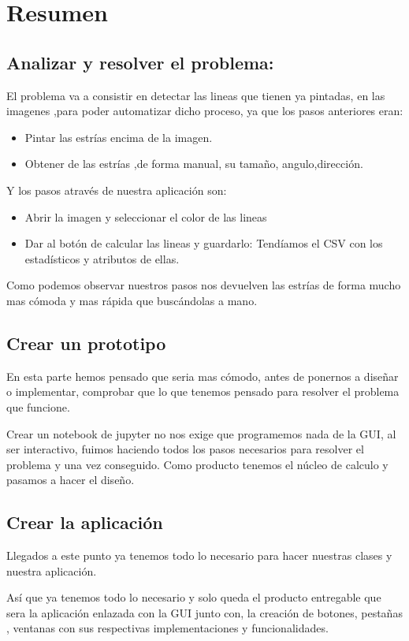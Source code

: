 \section{Resumen}

\subsection{Analizar y resolver el problema:}
El problema va a consistir en detectar las lineas que tienen ya pintadas, en las imagenes ,para poder automatizar dicho proceso, ya que los pasos anteriores eran:
\begin{itemize}
\item Pintar las estrías encima de la imagen.
\item Obtener de las estrías ,de forma manual, su tamaño, angulo,dirección.
\end{itemize}
Y los pasos através de nuestra aplicación son:
\begin{itemize}
\item Abrir la imagen y seleccionar el color de las lineas
\item Dar al botón de calcular las lineas y guardarlo: Tendíamos el CSV con los estadísticos y atributos de ellas.
\end{itemize}
Como podemos observar nuestros pasos nos devuelven las estrías de forma mucho mas cómoda y mas rápida que buscándolas a mano.

\subsection{Crear un prototipo} 
En esta parte hemos pensado que seria mas cómodo, antes de ponernos a diseñar o implementar, comprobar que lo que tenemos pensado para resolver el problema que funcione.

Crear un notebook de jupyter no nos exige que programemos nada de la GUI, al ser interactivo, fuimos haciendo todos los pasos necesarios para resolver el problema y una vez conseguido. Como producto tenemos el núcleo de calculo y pasamos a hacer el diseño.

\subsection{Crear la aplicación}
Llegados a este punto ya tenemos todo lo necesario para hacer nuestras clases y nuestra aplicación.

Así que ya tenemos todo lo necesario y solo queda el producto entregable que sera la aplicación enlazada con la GUI junto con, la creación de botones, pestañas , ventanas con sus respectivas implementaciones y funcionalidades.